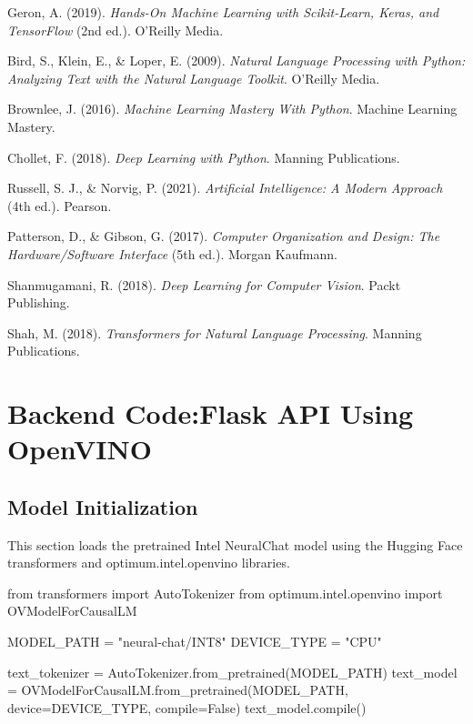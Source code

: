 \documentclass{josis}
\begin{document}
\begin{thebibliography}{8}

Geron, A. (2019). \textit{Hands-On Machine Learning with Scikit-Learn, Keras, and TensorFlow} (2nd ed.). O'Reilly Media.

Bird, S., Klein, E., \& Loper, E. (2009). \textit{Natural Language Processing with Python: Analyzing Text with the Natural Language Toolkit}. O'Reilly Media.

Brownlee, J. (2016). \textit{Machine Learning Mastery With Python}. Machine Learning Mastery.

Chollet, F. (2018). \textit{Deep Learning with Python}. Manning Publications.

Russell, S. J., \& Norvig, P. (2021). \textit{Artificial Intelligence: A Modern Approach} (4th ed.). Pearson.

Patterson, D., \& Gibson, G. (2017). \textit{Computer Organization and Design: The Hardware/Software Interface} (5th ed.). Morgan Kaufmann.

Shanmugamani, R. (2018). \textit{Deep Learning for Computer Vision}. Packt Publishing.

Shah, M. (2018). \textit{Transformers for Natural Language Processing}. Manning Publications.

\end{thebibliography}

\appendix
\section{Backend Code:Flask API Using OpenVINO}
\subsection{Model Initialization} 
This section loads the pretrained Intel NeuralChat model using the Hugging Face transformers and optimum.intel.openvino libraries.
\begin{python}
from transformers import AutoTokenizer
from optimum.intel.openvino import OVModelForCausalLM

MODEL_PATH = "neural-chat/INT8"
DEVICE_TYPE = "CPU"

text_tokenizer = AutoTokenizer.from_pretrained(MODEL_PATH)
text_model = OVModelForCausalLM.from_pretrained(MODEL_PATH, device=DEVICE_TYPE, compile=False)
text_model.compile()

\end{python}
\end{document}
